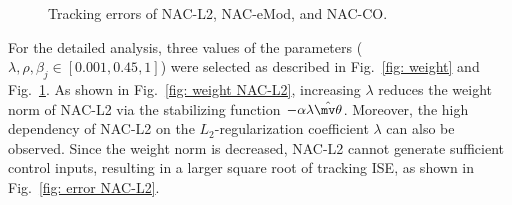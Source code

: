 \documentclass[letterpaper, 10 pt, conference]{ieeeconf}  %
\begin{document}
\begin{figure}[!t]      
    \centering
    \vfill
    \vfill
    \vfill
    \caption{Tracking errors of NAC-L2, NAC-eMod, and NAC-CO.}
    \label{fig: error}
\end{figure}

For the detailed analysis, three values of the parameters (\ie $\lambda,\rho,\beta_j\in[0.001,0.45,1]$) were selected as described in Fig.~\ref{fig: weight} and Fig.~\ref{fig: error}.
As shown in Fig.~\ref{fig: weight NAC-L2}, increasing $\lambda$ reduces the weight norm of NAC-L2 via the stabilizing function $-\alpha\lambda{\hat{\mv\theta}}$.
Moreover, the high dependency of NAC-L2 on the $L_2$-regularization coefficient $\lambda$ can also be observed.
Since the weight norm is decreased, NAC-L2 cannot generate sufficient control inputs, resulting in a larger square root of tracking ISE, as shown in Fig.~\ref{fig: error NAC-L2}.
\end{document}

